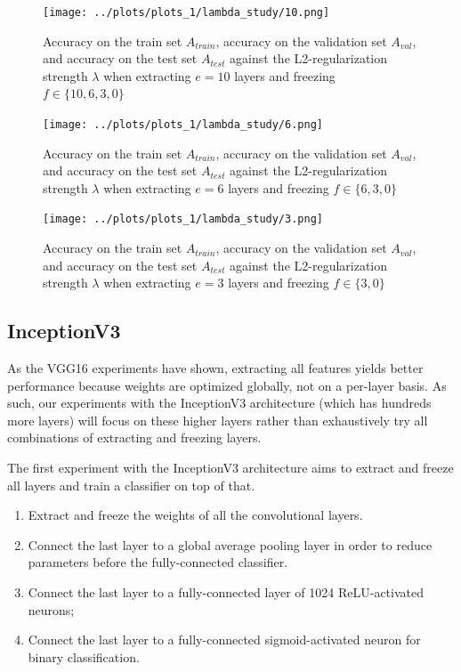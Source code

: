 \begin{figure}[ht]
    \centering
    \texttt{[image: ../plots/plots\_1/lambda\_study/10.png]}
    \caption{Accuracy on the train set $A_{train}$, accuracy on the validation set $A_{val}$, and accuracy on the test set $A_{test}$ against the L2-regularization strength $\lambda$ when extracting $e = 10$ layers and freezing $f \in \{10, 6, 3, 0\}$}
    \label{fig:results_1_10}
\end{figure}

\begin{figure}[ht]
    \centering
    \texttt{[image: ../plots/plots\_1/lambda\_study/6.png]}
    \caption{Accuracy on the train set $A_{train}$, accuracy on the validation set $A_{val}$, and accuracy on the test set $A_{test}$ against the L2-regularization strength $\lambda$ when extracting $e = 6$ layers and freezing $f \in \{6, 3, 0\}$}
    \label{fig:results_1_6}
\end{figure}

\begin{figure}[ht]
    \centering
    \texttt{[image: ../plots/plots\_1/lambda\_study/3.png]}
    \caption{Accuracy on the train set $A_{train}$, accuracy on the validation set $A_{val}$, and accuracy on the test set $A_{test}$ against the L2-regularization strength $\lambda$ when extracting $e = 3$ layers and freezing $f \in \{3, 0\}$}
    \label{fig:results_1_3}
\end{figure}


\subsection{InceptionV3}

As the VGG16 experiments have shown, extracting all features yields better performance because weights are optimized globally, not on a per-layer basis. As such, our experiments with the InceptionV3 architecture (which has hundreds more layers) will focus on these higher layers rather than exhaustively try all combinations of extracting and freezing layers.

The first experiment with the InceptionV3 architecture aims to extract and freeze all layers and train a classifier on top of that.

\begin{enumerate}
    \item Extract and freeze the weights of all the convolutional layers.
    \item Connect the last layer to a global average pooling layer in order to reduce parameters before the fully-connected classifier.
    \item Connect the last layer to a fully-connected layer of 1024 ReLU-activated neurons;
    \item Connect the last layer to a fully-connected sigmoid-activated neuron for binary classification.
\end{enumerate}

